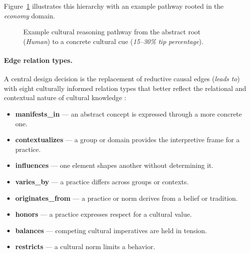 \documentclass[11pt]{article}
\begin{document}
\noindent Figure~\ref{fig:schema} illustrates this hierarchy with
an example pathway rooted in the \emph{economy} domain.

\begin{figure}[h]
\centering
{}
\caption{Example cultural reasoning pathway from the abstract root
(\emph{Human}) to a concrete cultural cue (\emph{15--30\% tip
percentage}).}
\label{fig:schema}
\end{figure}

\paragraph{Edge relation types.}
A central design decision is the replacement of reductive causal edges
(\emph{leads to}) with eight culturally informed relation types that
better reflect the relational and contextual nature of cultural knowledge
\cite{tonga2026llms}:

\begin{itemize}
    \item \textbf{manifests\_in} — an abstract concept is expressed
    through a more concrete one.
    \item \textbf{contextualizes} — a group or domain provides the
    interpretive frame for a practice.
    \item \textbf{influences} — one element shapes another without
    determining it.
    \item \textbf{varies\_by} — a practice differs across groups or
    contexts.
    \item \textbf{originates\_from} — a practice or norm derives from a
    belief or tradition.
    \item \textbf{honors} — a practice expresses respect for a cultural
    value.
    \item \textbf{balances} — competing cultural imperatives are held in
    tension.
    \item \textbf{restricts} — a cultural norm limits a behavior.
\end{itemize}
\end{document}
